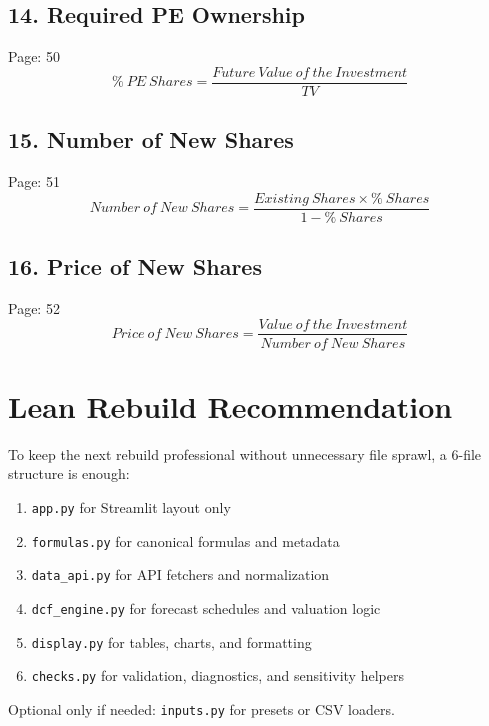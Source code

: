 \documentclass[11pt]{article}
\begin{document}
\subsection*{14. Required PE Ownership}
Page: 50
\[
\%\ PE\ Shares = \frac{Future\ Value\ of\ the\ Investment}{TV}
\]

\subsection*{15. Number of New Shares}
Page: 51
\[
Number\ of\ New\ Shares = \frac{Existing\ Shares \times \%\ Shares}{1 - \%\ Shares}
\]

\subsection*{16. Price of New Shares}
Page: 52
\[
Price\ of\ New\ Shares = \frac{Value\ of\ the\ Investment}{Number\ of\ New\ Shares}
\]

\section*{Lean Rebuild Recommendation}
To keep the next rebuild professional without unnecessary file sprawl, a 6-file structure is enough:
\begin{enumerate}
    \item \texttt{app.py} for Streamlit layout only
    \item \texttt{formulas.py} for canonical formulas and metadata
    \item \texttt{data\_api.py} for API fetchers and normalization
    \item \texttt{dcf\_engine.py} for forecast schedules and valuation logic
    \item \texttt{display.py} for tables, charts, and formatting
    \item \texttt{checks.py} for validation, diagnostics, and sensitivity helpers
\end{enumerate}

Optional only if needed: \texttt{inputs.py} for presets or CSV loaders.
\end{document}
